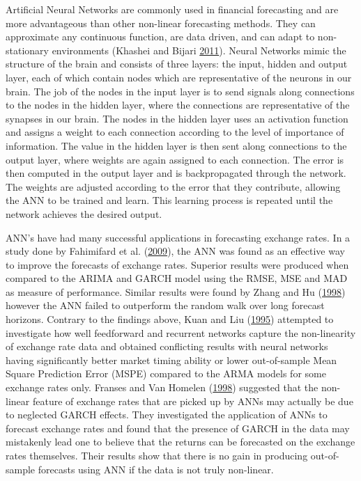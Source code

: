 \documentclass[12pt,preprint, authoryear]{elsarticle}
\numberwithin{equation}{section}
\numberwithin{figure}{section}
\numberwithin{table}{section}
\begin{document}
Artificial Neural Networks are commonly used in financial forecasting
and are more advantageous than other non-linear forecasting methods.
They can approximate any continuous function, are data driven, and can
adapt to non-stationary environments (Khashei and Bijari
\protect\hyperlink{ref-khashei2011}{2011}). Neural Networks mimic the
structure of the brain and consists of three layers: the input, hidden
and output layer, each of which contain nodes which are representative
of the neurons in our brain. The job of the nodes in the input layer is
to send signals along connections to the nodes in the hidden layer,
where the connections are representative of the synapses in our brain.
The nodes in the hidden layer uses an activation function and assigns a
weight to each connection according to the level of importance of
information. The value in the hidden layer is then sent along
connections to the output layer, where weights are again assigned to
each connection. The error is then computed in the output layer and is
backpropagated through the network. The weights are adjusted according
to the error that they contribute, allowing the ANN to be trained and
learn. This learning process is repeated until the network achieves the
desired output.

ANN's have had many successful applications in forecasting exchange
rates. In a study done by Fahimifard et al.
(\protect\hyperlink{ref-fahimifard2009}{2009}), the ANN was found as an
effective way to improve the forecasts of exchange rates. Superior
results were produced when compared to the ARIMA and GARCH model using
the RMSE, MSE and MAD as measure of performance. Similar results were
found by Zhang and Hu (\protect\hyperlink{ref-zhang1998}{1998}) however
the ANN failed to outperform the random walk over long forecast
horizons. Contrary to the findings above, Kuan and Liu
(\protect\hyperlink{ref-kuan1995}{1995}) attempted to investigate how
well feedforward and recurrent networks capture the non-linearity of
exchange rate data and obtained conflicting results with neural networks
having significantly better market timing ability or lower out-of-sample
Mean Square Prediction Error (MSPE) compared to the ARMA models for some
exchange rates only. Franses and Van Homelen
(\protect\hyperlink{ref-franses1998}{1998}) suggested that the
non-linear feature of exchange rates that are picked up by ANNs may
actually be due to neglected GARCH effects. They investigated the
application of ANNs to forecast exchange rates and found that the
presence of GARCH in the data may mistakenly lead one to believe that
the returns can be forecasted on the exchange rates themselves. Their
results show that there is no gain in producing out-of-sample forecasts
using ANN if the data is not truly non-linear.
\end{document}
